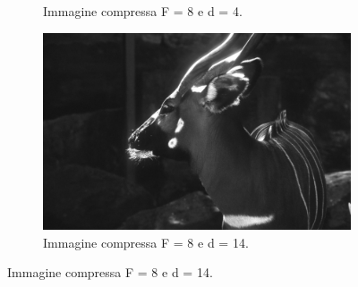 \begin{figure}[!ht]
\begin{subfigure}[!ht]{0.45\textwidth}
        \caption{Immagine compressa F = 8 e d = 4.}
    \end{subfigure}
    \begin{subfigure}[!ht]{0.45\textwidth}
        \includegraphics[width=\textwidth]{Progetto_2/img/gui_compressed14.png}
        \caption{Immagine compressa F = 8 e d = 14.}
    \end{subfigure}
\end{figure}
